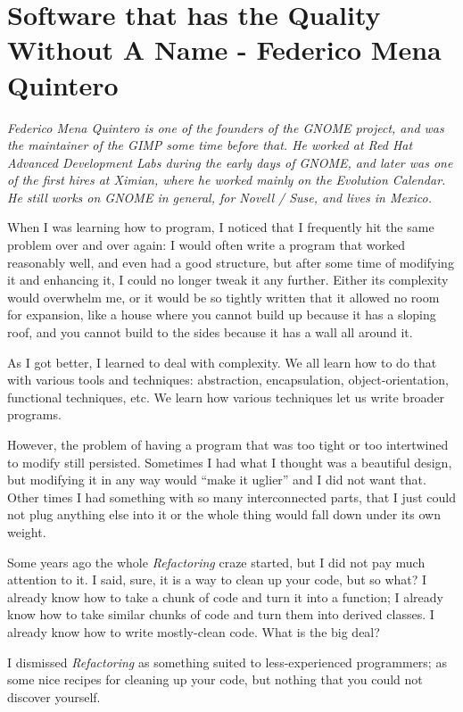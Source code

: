 \chapter{Software that has the Quality Without A Name - Federico Mena Quintero}
\textit{Federico Mena Quintero is one of the founders of the GNOME
  project, and was the maintainer of the GIMP some time before that.
  He worked at Red Hat Advanced Development Labs during the early days
  of GNOME, and later was one of the first hires at Ximian, where he
  worked mainly on the Evolution Calendar.  He still works on GNOME in
  general, for Novell / Suse, and lives in Mexico.}

When I was learning how to program, I noticed that I frequently hit the same
problem over and over again: I would often write a program that worked
reasonably well, and even had a good structure, but after some time of modifying
it and enhancing it, I could no longer tweak it any further. Either its
complexity would overwhelm me, or it would be so tightly written that it allowed
no room for expansion, like a house where you cannot build up because it has a
sloping roof, and you cannot build to the sides because it has a wall all around
it.

As I got better, I learned to deal with complexity. We all learn how to do that
with various tools and techniques: abstraction, encapsulation,
object-orientation, functional techniques, etc. We learn how various techniques
let us write broader programs.

However, the problem of having a program that was too tight or too intertwined
to modify still persisted. Sometimes I had what I thought was a beautiful
design, but modifying it in any way would ``make it uglier'' and I did not want
that. Other times I had something with so many interconnected parts, that I just
could not plug anything else into it or the whole thing would fall down under
its own weight.

Some years ago the whole \textit{Refactoring} craze started, but I did not pay
much attention to it. I said, sure, it is a way to clean up your code, but so
what? I already know how to take a chunk of code and turn it into a function; I
already know how to take similar chunks of code and turn them into derived
classes. I already know how to write mostly-clean code. What is the big deal?

I dismissed \textit{Refactoring} as something suited to less-experienced
programmers; as some nice recipes for cleaning up your code, but nothing that
you could not discover yourself.

